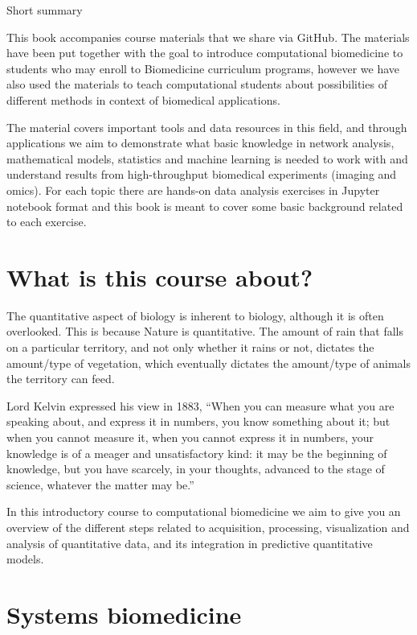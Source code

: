\documentclass[
]{book}
\begin{document}
Short summary

This book accompanies course materials that we share via GitHub. The materials have been put together with the goal to introduce computational biomedicine to students who may enroll to Biomedicine curriculum programs, however we have also used the materials to teach computational students about possibilities of different methods in context of biomedical applications.

The material covers important tools and data resources in this field, and through applications we aim to demonstrate what basic knowledge in network analysis, mathematical models, statistics and machine learning is needed to work with and understand results from high-throughput biomedical experiments (imaging and omics). For each topic there are hands-on data analysis exercises in Jupyter notebook format and this book is meant to cover some basic background related to each exercise.

\hypertarget{what-is-this-course-about}{%
\section{What is this course about?}\label{what-is-this-course-about}}

The quantitative aspect of biology is inherent to biology, although it is often overlooked. This is because Nature is quantitative. The amount of rain that falls on a particular territory, and not only whether it rains or not, dictates the amount/type of vegetation, which eventually dictates the amount/type of animals the territory can feed.

Lord Kelvin expressed his view in 1883, ``When you can measure what you are speaking about, and express it in numbers, you know something about it;
but when you cannot measure it, when you cannot express it in numbers, your knowledge is of a meager and unsatisfactory kind:
it may be the beginning of knowledge, but you have scarcely, in your thoughts, advanced to the stage of science, whatever the matter may be.''

In this introductory course to computational biomedicine we aim to give you an overview of the different steps related to acquisition, processing, visualization and analysis of quantitative data, and its integration in predictive quantitative models.

\hypertarget{systems-biomedicine}{%
\section{Systems biomedicine}\label{systems-biomedicine}}
\end{document}
